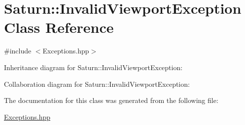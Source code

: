 \hypertarget{class_saturn_1_1_invalid_viewport_exception}{}\section{Saturn\+:\+:Invalid\+Viewport\+Exception Class Reference}
\label{class_saturn_1_1_invalid_viewport_exception}


{\ttfamily \#include $<$Exceptions.\+hpp$>$}



Inheritance diagram for Saturn\+:\+:Invalid\+Viewport\+Exception\+:


Collaboration diagram for Saturn\+:\+:Invalid\+Viewport\+Exception\+:


The documentation for this class was generated from the following file\+:\begin{DoxyCompactItemize}
\item 
\mbox{\hyperlink{_exceptions_8hpp}{Exceptions.\+hpp}}\end{DoxyCompactItemize}
